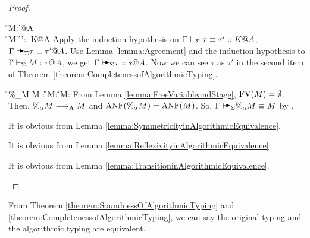 \begin{proof}
    \begin{rneqncase}{\TConv}{
            \G\V M:\tau'@A \\
            \G\V M:\tau@A {}
            \G\V \tau\equiv \tau':: K@A
        }
        Apply the induction hypothesis on \( \Gamma\vdash_\Sigma \tau\equiv \tau':: K@A \), \(
        \G\AVS \tau\equiv \tau' @A \).  Use Lemma \ref{lemma:Agreement} and the
        induction hypothesis to \( \Gamma\vdash_\Sigma M : \tau @A \), we get \( \G\AVS \tau
        :: * @ A \). Now we can see \( \tau \) as \( \tau' \) in the second
        item of Theorem \ref{theorem:CompletenessofAlgorithmicTyping}.
    \end{rneqncase}
    \begin{rneqncase}{\QPercent}{
            \G\V\%_\alpha M \E M : 
            \G\V M: 
            \G\V M:\tau@A
        }
        From Lemma \ref{lemma:FreeVariableandStage}, \( \text{FV}(M) = \emptyset \). Then, \( \%_\alpha M \longrightarrow_{\text{A}} M \) and \( \text{ANF}(\%_\alpha M) = \text{ANF}(M) \). So, \( \G\AVS\%_\alpha M \E M \) by \QAANF.
    \end{rneqncase}
    \begin{rneqncase}{\QKSym}{}
        It is obvious from Lemma \ref{lemma:SymmetricityinAlgorithmicEquivalence}.
    \end{rneqncase}
    \begin{rneqncase}{\QKRefl}{}
        It is obvious from Lemma \ref{lemma:ReflexivityinAlgorithmicEquivalence}.
    \end{rneqncase}
    \begin{rneqncase}{\QKTrans}{}
        It is obvious from Lemma \ref{lemma:TransitioninAlgorithmicEquivalence}.
    \end{rneqncase}
\end{proof}

From Theorem \ref{theorem:SoundnessOfAlgorithmicTyping} and
\ref{theorem:CompletenessofAlgorithmicTyping}, we can say the original typing
and the algorithmic typing are equivalent.
